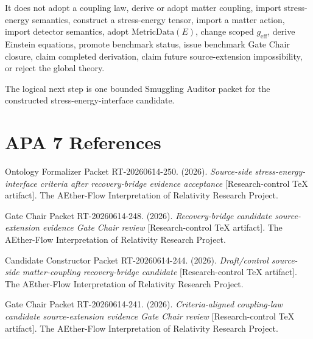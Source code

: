 \documentclass[11pt]{article}
\newcommand{\MetricData}{\mathrm{MetricData}}
\newcommand{\geff}{g_{\mathrm{eff}}}
\begin{document}
It does not adopt a coupling law, derive or adopt matter coupling, import
stress-energy semantics, construct a stress-energy tensor, import a matter
action, import detector semantics, adopt \(\MetricData(E)\), change scoped
\(\geff\), derive Einstein equations, promote benchmark status, issue
benchmark Gate Chair closure, claim completed derivation, claim future
source-extension impossibility, or reject the global theory.

The logical next step is one bounded Smuggling Auditor packet for the
constructed stress-energy-interface candidate.

\section{APA 7 References}

Ontology Formalizer Packet RT-20260614-250. (2026). \emph{Source-side
stress-energy-interface criteria after recovery-bridge evidence acceptance}
[Research-control TeX artifact]. The AEther-Flow Interpretation of Relativity
Research Project.

Gate Chair Packet RT-20260614-248. (2026). \emph{Recovery-bridge candidate
source-extension evidence Gate Chair review} [Research-control TeX artifact].
The AEther-Flow Interpretation of Relativity Research Project.

Candidate Constructor Packet RT-20260614-244. (2026). \emph{Draft/control
source-side matter-coupling recovery-bridge candidate} [Research-control TeX
artifact]. The AEther-Flow Interpretation of Relativity Research Project.

Gate Chair Packet RT-20260614-241. (2026). \emph{Criteria-aligned
coupling-law candidate source-extension evidence Gate Chair review}
[Research-control TeX artifact]. The AEther-Flow Interpretation of Relativity
Research Project.
\end{document}
